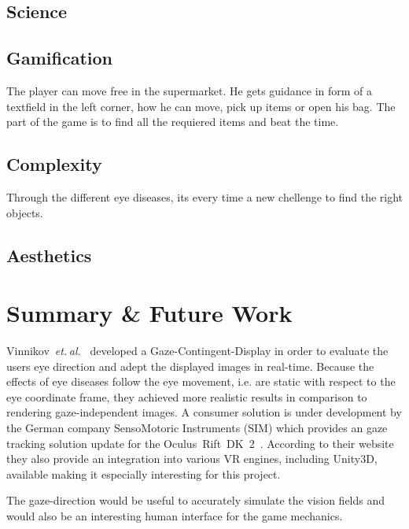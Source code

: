 \documentclass{acm_proc_article-sp}
\newcommand{\etal}{\textit{et. al.}}
\begin{document}
\subsection{Science}
\subsection{Gamification}
The player can move free in the supermarket. He gets guidance in form of a textfield in the left corner, how he can move, pick up items or open his bag. The part of the game is to find all the requiered items and beat the time.
\subsection{Complexity}
Through the different eye diseases, its every time a new chellenge to find the right objects. 
\subsection{Aesthetics}
%
%
\section{Summary \& Future Work}
Vinnikov \etal \cite{gazedisplays} developed a Gaze-Contingent-Display in order to evaluate the users eye direction and adept the displayed images in real-time.
Because the effects of eye diseases follow the eye movement, i.e. are static with respect to the eye coordinate frame, they achieved more realistic results in comparison to rendering gaze-independent images.
A consumer solution is under development by the German company SensoMotoric Instruments (SIM) which provides an gaze tracking solution update for the Oculus Rift DK 2 \cite{smi-oculus, arstechoculus}.
According to their website they also provide an integration into various VR engines, including Unity3D, available making it especially interesting for this project.

The gaze-direction would be useful to accurately simulate the vision fields and would also be an interesting human interface for the game mechanics.
%
\printbibliography

\balancecolumns
\end{document}
